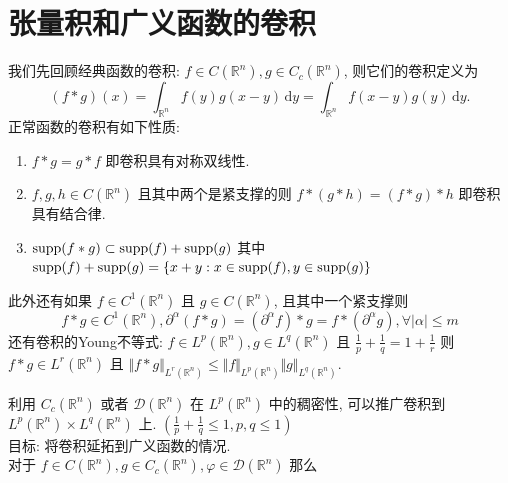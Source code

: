 \documentclass[11pt]{ctexart}[UTF8]
\begin{document}
\section{张量积和广义函数的卷积}
我们先回顾经典函数的卷积: $f \in C(\mathbb{R}^{n}), g \in C_c(\mathbb{R}^{n})$, 则它们的卷积定义为
\begin{equation*}
    (f * g)(x) = \int_{\mathbb{R}^{n}} f(y) g(x-y) \, \mathrm{d}y = \int_{\mathbb{R}^{n}} f(x-y) g(y) \, \mathrm{d}y.
\end{equation*}
正常函数的卷积有如下性质:
\begin{property}\leavevmode
    \begin{enumerate}
        \item $f * g = g * f$ 即卷积具有对称双线性.
        \item $f,g,h \in C(\mathbb{R}^{n})$ 且其中两个是紧支撑的则 $f * (g * h) = (f * g) * h$ 即卷积具有结合律.
        \item $\operatorname{supp}(f * g) \subset \operatorname{supp}(f) + \operatorname{supp}(g)$ 其中 $\operatorname{supp}(f) + \operatorname{supp}(g) = \{x + y : x \in \operatorname{supp}(f), y \in \operatorname{supp}(g)\}$
    \end{enumerate}
\end{property}
此外还有如果 $f \in C^{1}(\mathbb{R}^{n})$ 且 $g \in C(\mathbb{R}^{n})$, 且其中一个紧支撑则
\begin{equation*}
    f * g \in C^{1}(\mathbb{R}^{n}), \partial^{\alpha} (f * g) = (\partial^{\alpha} f) * g = f * (\partial^{\alpha} g), \forall |\alpha| \leq m
\end{equation*}
还有卷积的Young不等式: $f \in L^{p}(\mathbb{R}^{n}), g \in L^{q}(\mathbb{R}^{n})$ 且 $\frac{1}{p} + \frac{1}{q} = 1 + \frac{1}{r}$ 则 $f * g \in L^{r}(\mathbb{R}^{n})$ 
且 $\Vert f * g \Vert_{L^{r}(\mathbb{R}^{n})} \leq \Vert f \Vert_{L^{p}(\mathbb{R}^{n})} \Vert g \Vert_{L^{q}(\mathbb{R}^{n})}$.\par
利用 $C_{c}(\mathbb{R}^{n})$ 或者 $\mathscr{D}(\mathbb{R}^{n})$ 在 $L^{p}(\mathbb{R}^{n})$ 中的稠密性, 可以推广卷积到 $L^{p}(\mathbb{R}^{n})\times L^{q}(\mathbb{R}^{n})$ 上. $(\frac{1}{p}+\frac{1}{q} \leq 1,p,q \leq 1)$\\
目标: 将卷积延拓到广义函数的情况.\\
对于 $f \in C(\mathbb{R}^{n}), g \in C_{c}(\mathbb{R}^{n}), \varphi \in \mathscr{D}(\mathbb{R}^{n})$ 那么
\end{document}
